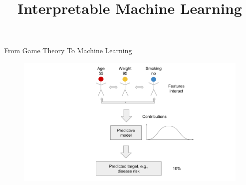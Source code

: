 \documentclass[11pt,compress,t,notes=noshow, aspectratio=169, xcolor=table]{beamer}
\title{Interpretable Machine Learning}
\date{}
\begin{document}
\newcommand{\titlefigure}{figure_man/bike-sharing03.png}
\newcommand{\learninggoals}{
\item See model predictions as a cooperative game
\item Transfer the Shapley value concept from game theory to machine learning
}



\begin{frame}{From Game Theory To Machine Learning}

\begin{figure}
    \centering
    \includegraphics{figure/Shapley_6.png}
\end{figure}

\end{frame}
\end{document}
